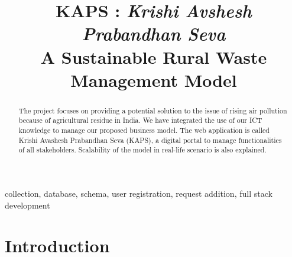 \documentclass[conference]{IEEEtran}
\begin{document}
\title{KAPS : \emph{Krishi Avshesh Prabandhan Seva}\\
A Sustainable Rural Waste Management Model
}

\author{
\and
{}
}

\maketitle

\begin{abstract}
The project focuses on providing a potential solution to the issue of rising air pollution because of agricultural residue in India. We have integrated the use of our ICT knowledge to manage our proposed business model. The web application is called Krishi Avashesh Prabandhan Seva (KAPS), a digital portal to manage functionalities of all stakeholders. Scalability of the model in real-life scenario is also explained.\\
\end{abstract}
\begin{IEEEkeywords}
collection, database, schema, user registration, request addition, full stack development
\end{IEEEkeywords}
\section{Introduction}
\end{document}
